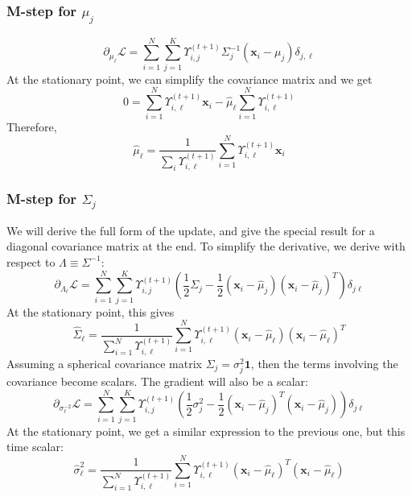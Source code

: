 \documentclass{article}
\numberwithin{equation}{section}
\theoremstyle{named}
\begin{document}
\subsubsection{M-step for $\mu_j$}
\[
        \partial_{\mu_\ell} \mathcal{L} = \sum_{i = 1}^{N} \sum_{j = 1}^{K} 
        \Upsilon_{i, j}^{(t+1)}\Sigma^{-1}_j(\mathbf{x}_i - \mu_j) \delta_{j, \ell}
\]
At the stationary point, we can simplify the covariance matrix and we get 
\[
        0 = \sum_{i = 1}^{N} \Upsilon_{i, \ell}^{(t+1)}\mathbf{x}_i 
        - \hat{\mu}_\ell\sum_{i = 1}^{N}\Upsilon_{i, \ell}^{(t+1)}
\]
Therefore, 
\[
      \boxed{  \hat{\mu}_{\ell} = \frac{1}{\displaystyle \sum_i \Upsilon_{i, \ell} 
      ^{(t+1)}} \sum_{i = 1}^{N} \Upsilon_{i, \ell}^{(t + 1)} \mathbf{x}_i}
\]
\subsubsection{M-step for $\Sigma_j$}
We will derive the full form of the update, and give the special result for a 
diagonal covariance matrix at the end. To simplify the derivative, we derive 
with respect to $\Lambda \equiv \Sigma^{-1}$:
\[
        \partial_{\Lambda_\ell} \mathcal{L} = \sum_{i = 1}^{N} \sum_{j = 1}^{K} 
        \Upsilon_{i, j}^{(t+1)}
        \left(\frac{1}{2} \Sigma_j 
                - \frac{1}{2}
        (\mathbf{x}_i - \hat{\mu}_j)(\mathbf{x}_i - \hat{\mu}_j)^{T} \right) \delta_{j \ell} 
\]
At the stationary point, this gives
\[
        \hat{\Sigma}_\ell =
        \frac{1}{\displaystyle\sum_{i = 1}^{N} \Upsilon_{i, \ell}^{(t+1)} } 
        \sum_{i = 1}^{N} \Upsilon_{i, \ell}^{(t + 1)} 
        (\mathbf{x}_i - \hat{\mu}_\ell)(\mathbf{x}_i - \hat{\mu}_\ell)^{T}
\]
Assuming a spherical covariance matrix $\Sigma_j = \sigma^{2}_j\mathbf{1}$, then 
the terms involving the covariance become scalars. The gradient will 
also be a scalar: 
\[
        \partial_{\sigma^{-2}_\ell} \mathcal{L} = 
        \sum_{i = 1}^{N} \sum_{j =1}^{K}
        \Upsilon_{i, j}^{(t + 1)}
        \left(  
                \frac{1}{2}\sigma^{2}_j - \frac{1}{2}(\mathbf{x}_i - \hat{\mu}_j)^{T} 
                (\mathbf{x}_i - \hat{\mu}_j)
\right)\delta_{j \ell}
\]
At the stationary point, we get a similar expression to the previous one, but this 
time scalar:
\[
       \boxed{ \hat{\sigma}^{2}_\ell = \frac{1}{\displaystyle 
        \sum_{i = 1}^{N} \Upsilon_{i, \ell}^{(t+1)}} 
        \sum_{i = 1}^{N} \Upsilon_{i,\ell}^{(t+1)} (\mathbf{x}_i - \hat{\mu}_\ell)^{T} 
(\mathbf{x}_i - \hat{\mu}_\ell)}
\]
\end{document}
